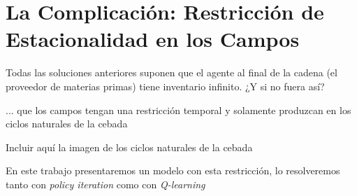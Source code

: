 \chapter{La Complicaci\'on: Restricci\'on de Estacionalidad en los Campos}

Todas las soluciones anteriores suponen que el agente al final de la cadena (el proveedor de materias primas) tiene inventario infinito. ¿Y si no fuera as\'i?

... que los campos tengan una restricci\'on temporal y solamente produzcan en los ciclos naturales de la cebada

Incluir aqu\'i la imagen de los ciclos naturales de la cebada

En este trabajo presentaremos un modelo con esta restricci\'on, lo resolveremos tanto con \textit{policy iteration} como con \textit{Q-learning}
